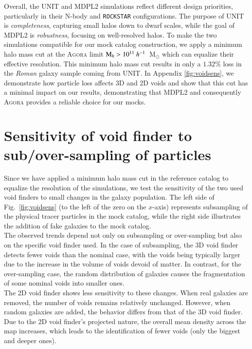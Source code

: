 \documentclass[]{aa} %
\begin{document}
Overall, the UNIT and MDPL2 simulations reflect different design priorities, particularly in their N-body and \texttt{ROCKSTAR} configurations. The purpose of UNIT is \emph{completeness}, capturing small halos down to dwarf scales, while the goal of MDPL2 is \emph{robustness}, focusing on well-resolved halos. To make the two simulations compatible for our mock catalog construction, we apply a minimum halo mass cut at the \textsc{Agora} limit ${\rm M}_h > 10^{11}~h^{-1}$~M$_{\odot}$ which can equalize their effective resolution. This minimum halo mass cut results in only a $1.32\%$ loss in the \emph{Roman} galaxy sample coming from UNIT. In Appendix \ref{fig:voidsens}, we demonstrate how particle loss affects 3D and 2D voids and show that this cut has a minimal impact on our results, demonstrating that MDPL2 and consequently \textsc{Agora} provides a reliable choice for our mocks.

\section{Sensitivity of void finder to sub/over-sampling of particles}

Since we have applied a minimum halo mass cut in the reference catalog to equalize the resolution of the simulations, we test the sensitivity of the two used void finders to small changes in the galaxy population. The left side of Fig.~\ref{fig:voidsens} (to the left of the zero on the $x$-axis) represents subsampling of the physical tracer particles in the mock catalog, while the right side illustrates the addition of fake galaxies to the mock catalog.\\

The observed trends depend not only on subsampling or over-sampling but also on the specific void finder used. In the case of subsampling, the 3D void finder detects fewer voids than the nominal case, with the voids being typically larger due to the increase in the volume of voids devoid of matter. In contrast, for the over-sampling case, the random distribution of galaxies causes the fragmentation of some nominal voids into smaller ones.\\

The 2D void finder shows less sensitivity to these changes. When real galaxies are removed, the number of voids remains relatively unchanged. However, when random galaxies are added, the behavior differs from that of the 3D void finder. Due to the 2D void finder’s projected nature, the overall mean density across the map increases, which leads to the identification of fewer voids (only the biggest and deeper ones).
\end{document}
